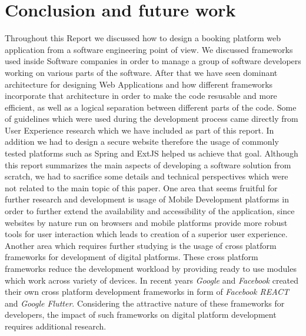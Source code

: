 \chapter{Conclusion and future work}
\label{chapter6}
\thispagestyle{plain}
Throughout this Report we discussed how to design a booking platform web application from a software engineering point of view. We discussed frameworks used inside Software companies in order to manage a group of software developers working on various parts of the software. After that we have seen dominant architecture for designing Web Applications and how different frameworks incorporate that architecture in order to make the code resusable and more efficient, as well as a logical separation between different parts of the code.
Some of guidelines which were used during the development process came directly from User Experience research which we have included as part of this report. In addition we had to design a secure website therefore the usage of commonly tested platforms such as Spring and ExtJS helped us achieve that goal.
Although this report summarizes the main aspects of developing a software solution from scratch, we had to sacrifice some details and technical perspectives which were not related to the main topic of this paper. One area that seems fruitful for further research and development is usage of Mobile Development platforms in order to further extend the availability and accessibility of the application, since websites by nature run on browsers and 
mobile platforms provide more robust tools for user interaction which leads to creation of a superior user experience.
Another area which requires further studying is the usage of cross platform frameworks for development of digital platforms. These cross platform frameworks reduce the development workload by providing ready to use modules which work across variety of devices. In recent years \textit{Google} and \textit{Facebook} created their own cross platform development frameworks in form of \textit{Facebook REACT} and \textit{Google Flutter}. Considering the attractive nature of these frameworks for developers, the impact of such frameworks on digital platform development requires additional research.